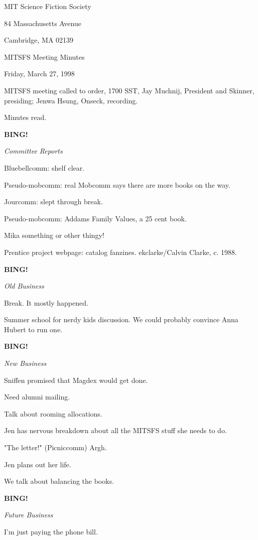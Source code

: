 \documentclass[12pt]{article}
\newcommand{\bing}{{\bf BING!} }
\newcommand{\goto}[1]{\bing \vskip 12pt \centerline{{\em{#1}}}}
\begin{document}
\begin{center}

MIT Science Fiction Society 

84 Massachusetts Avenue

Cambridge, MA 02139

\vspace{12pt}

MITSFS Meeting Minutes 

Friday, March 27, 1998

\end{center}
 
\vspace{18pt}

\setlength{\parskip}{6pt}

\noindent
MITSFS meeting called to order, 1700 SST,
Jay Muchnij, President and Skinner, presiding; Jenwa Hsung, Onseck, recording.

Minutes read.

\goto{Committee Reports}

Bluebellcomm: shelf clear.

Pseudo-mobcomm: real Mobcomm says there are more books on the way.

Jourcomm: slept through break.

Pseudo-mobcomm: Addams Family Values, a 25 cent book.

Mika something or other thingy!

Prentice project webpage: catalog fanzines. ekclarke/Calvin Clarke, c. 1988.

\goto{Old Business}

Break. It mostly happened.

Summer school for nerdy kids discussion. We could probably convince Anna Hubert to run one.

\goto{New Business}

Sniffen promised that Magdex would get done.

Need alumni mailing.

Talk about rooming allocations.

Jen has nervous breakdown about all the MITSFS stuff she needs to do.

"The letter!" (Picniccomm) Argh.

Jen plans out her life.

We talk about balancing the books.

\goto{Future Business}

I'm just paying the phone bill.
\end{document}
